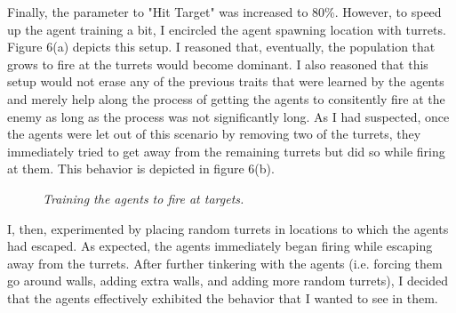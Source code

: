 \documentclass{article} %
\begin{document}
Finally, the parameter to "Hit Target" was increased to 80\%. However, to speed up the agent training a bit, I encircled the agent spawning location with turrets. Figure 6(a) depicts this setup. I reasoned that, eventually, the population that grows to fire at the turrets would become dominant. I also reasoned that this setup would not erase any of the previous traits that were learned by the agents and merely help along the process of getting the agents to consitently fire at the enemy as long as the process was not significantly long. As I had suspected, once the agents were let out of this scenario by removing two of the turrets, they immediately tried to get away from the remaining turrets but did so while firing at them. This behavior is depicted in figure 6(b).

\begin{figure}[H]%
	\centering
    	\hfill%
    	\hfill%
    \caption{\textit{Training the agents to fire at targets.}}
    \label{fig:default}
\end{figure} 

I, then, experimented by placing random turrets in locations to which the agents had escaped. As expected, the agents immediately began firing while escaping away from the turrets. After further tinkering with the agents (i.e. forcing them go around walls, adding extra walls, and adding more random turrets), I decided that the agents effectively exhibited the behavior that I wanted to see in them. 
\end{document}
